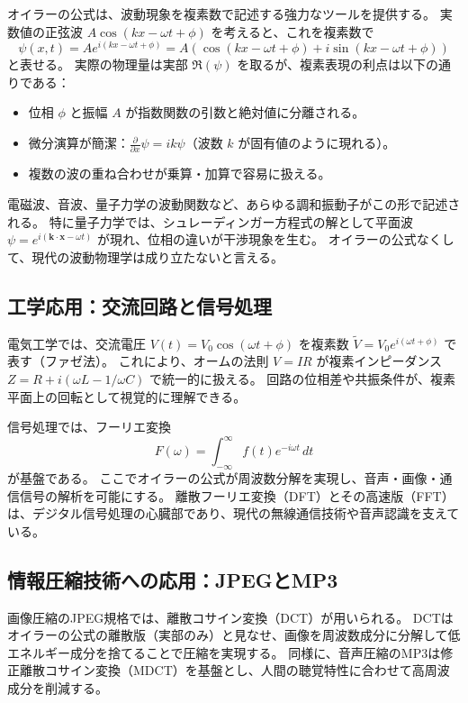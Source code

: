\documentclass[dvipdfmx,a4paper]{jsbook}
\theoremstyle{definition}
\theoremstyle{remark}
\begin{document}
オイラーの公式は、波動現象を複素数で記述する強力なツールを提供する。
実数値の正弦波 $A \cos(kx - \omega t + \phi)$ を考えると、これを複素数で
\begin{equation}
  \psi(x,t) = A e^{i(kx - \omega t + \phi)} = A (\cos(kx - \omega t + \phi) + i \sin(kx - \omega t + \phi))
\end{equation}
と表せる。
実際の物理量は実部 $\Re(\psi)$ を取るが、複素表現の利点は以下の通りである：
\begin{itemize}
  \item 位相 $\phi$ と振幅 $A$ が指数関数の引数と絶対値に分離される。
  \item 微分演算が簡潔：$\frac{\partial}{\partial x} \psi = i k \psi$（波数 $k$ が固有値のように現れる）。
  \item 複数の波の重ね合わせが乗算・加算で容易に扱える。
\end{itemize}

電磁波、音波、量子力学の波動関数など、あらゆる調和振動子がこの形で記述される。
特に量子力学では、シュレーディンガー方程式の解として平面波 $\psi = e^{i(\mathbf{k}\cdot\mathbf{x} - \omega t)}$ が現れ、位相の違いが干渉現象を生む。
オイラーの公式なくして、現代の波動物理学は成り立たないと言える。

\subsection{工学応用：交流回路と信号処理}

電気工学では、交流電圧 $V(t) = V_0 \cos(\omega t + \phi)$ を複素数 $\tilde{V} = V_0 e^{i(\omega t + \phi)}$ で表す（ファゼ法）。
これにより、オームの法則 $V = I R$ が複素インピーダンス $Z = R + i(\omega L - 1/\omega C)$ で統一的に扱える。
回路の位相差や共振条件が、複素平面上の回転として視覚的に理解できる。

信号処理では、フーリエ変換
\begin{equation}
  F(\omega) = \int_{-\infty}^\infty f(t) e^{-i\omega t} \, dt
\end{equation}
が基盤である。
ここでオイラーの公式が周波数分解を実現し、音声・画像・通信信号の解析を可能にする。
離散フーリエ変換（DFT）とその高速版（FFT）は、デジタル信号処理の心臓部であり、現代の無線通信技術や音声認識を支えている。

\subsection{情報圧縮技術への応用：JPEGとMP3}

画像圧縮のJPEG規格では、離散コサイン変換（DCT）が用いられる。
DCTはオイラーの公式の離散版（実部のみ）と見なせ、画像を周波数成分に分解して低エネルギー成分を捨てることで圧縮を実現する。
同様に、音声圧縮のMP3は修正離散コサイン変換（MDCT）を基盤とし、人間の聴覚特性に合わせて高周波成分を削減する。
\end{document}
